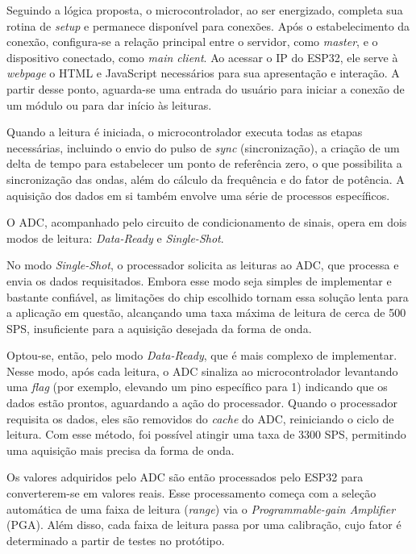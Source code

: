 Seguindo a lógica proposta, o microcontrolador, ao ser energizado, completa sua rotina de \textit{setup} e permanece disponível para conexões. Após o estabelecimento da conexão, configura-se a relação principal entre o servidor, como \textit{master}, e o dispositivo conectado, como \textit{main client}. Ao acessar o IP do ESP32, ele serve à \textit{webpage} o HTML e JavaScript necessários para sua apresentação e interação. A partir desse ponto, aguarda-se uma entrada do usuário para iniciar a conexão de um módulo ou para dar início às leituras.

Quando a leitura é iniciada, o microcontrolador executa todas as etapas necessárias, incluindo o envio do pulso de \textit{sync} (sincronização), a criação de um delta de tempo para estabelecer um ponto de referência zero, o que possibilita a sincronização das ondas, além do cálculo da frequência e do fator de potência. A aquisição dos dados em si também envolve uma série de processos específicos.

O \gls{ADC}, acompanhado pelo circuito de condicionamento de sinais, opera em dois modos de leitura: \textit{Data-Ready} e \textit{Single-Shot}.

No modo \textit{Single-Shot}, o processador solicita as leituras ao \gls{ADC}, que processa e envia os dados requisitados. Embora esse modo seja simples de implementar e bastante confiável, as limitações do chip escolhido tornam essa solução lenta para a aplicação em questão, alcançando uma taxa máxima de leitura de cerca de 500 \gls{SPS}, insuficiente para a aquisição desejada da forma de onda.

Optou-se, então, pelo modo \textit{Data-Ready}, que é mais complexo de implementar. Nesse modo, após cada leitura, o \gls{ADC} sinaliza ao microcontrolador levantando uma \textit{flag} (por exemplo, elevando um pino específico para 1) indicando que os dados estão prontos, aguardando a ação do processador. Quando o processador requisita os dados, eles são removidos do \textit{cache} do \gls{ADC}, reiniciando o ciclo de leitura. Com esse método, foi possível atingir uma taxa de 3300 \gls{SPS}, permitindo uma aquisição mais precisa da forma de onda.

Os valores adquiridos pelo \gls{ADC} são então processados pelo ESP32 para converterem-se em valores reais. Esse processamento começa com a seleção automática de uma faixa de leitura (\textit{range}) via o \textit{Programmable-gain Amplifier} (\gls{PGA}). Além disso, cada faixa de leitura passa por uma calibração, cujo fator é determinado a partir de testes no protótipo.

